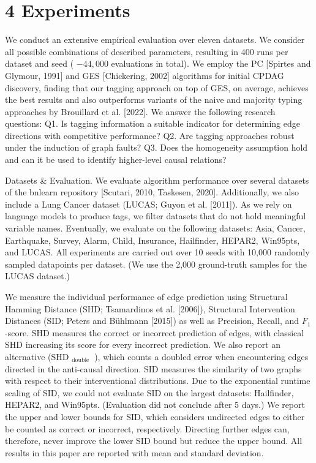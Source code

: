 \documentclass[10pt]{article}
\begin{document}
\section*{4 Experiments}
We conduct an extensive empirical evaluation over eleven datasets. We consider all possible combinations of described parameters, resulting in 400 runs per dataset and seed ( $-44,000$ evaluations in total). We employ the PC [Spirtes and Glymour, 1991] and GES [Chickering, 2002] algorithms for initial CPDAG discovery, finding that our tagging approach on top of GES, on average, achieves the best results and also outperforms variants of the naive and majority typing approaches by Brouillard et al. [2022]. We answer the following research questions: Q1. Is tagging information a suitable indicator for determining edge directions with competitive performance? Q2. Are tagging approaches robust under the induction of graph faults? Q3. Does the homogeneity assumption hold and can it be used to identify higher-level causal relations?

Datasets \& Evaluation. We evaluate algorithm performance over several datasets of the bnlearn repository [Scutari, 2010, Taskesen, 2020]. Additionally, we also include a Lung Cancer dataset (LUCAS; Guyon et al. [2011]). As we rely on language models to produce tags, we filter datasets that do not hold meaningful variable names. Eventually, we evaluate on the following datasets: Asia, Cancer, Earthquake, Survey, Alarm, Child, Insurance, Hailfinder, HEPAR2, Win95pts, and LUCAS. All experiments are carried out over 10 seeds with 10,000 randomly sampled datapoints per dataset. (We use the 2,000 ground-truth samples for the LUCAS dataset.)

We measure the individual performance of edge prediction using Structural Hamming Distance (SHD; Tsamardinos et al. [2006]), Structural Intervention Distances (SID; Peters and Bühlmann [2015]) as well as Precision, Recall, and $F_{1}$-score. SHD measures the correct or incorrect prediction of edges, with classical SHD increasing its score for every incorrect prediction. We also report an alternative (SHD ${ }_{\text {double }}$ ), which counts a doubled error when encountering edges directed in the anti-causal direction. SID measures the similarity of two graphs with respect to their interventional distributions. Due to the exponential runtime scaling of SID, we could not evaluate SID on the largest datasets: Hailfinder, HEPAR2, and Win95pts. (Evaluation did not conclude after 5 days.) We report the upper and lower bounds for SID, which considers undirected edges to either be counted as correct or incorrect, respectively. Directing further edges can, therefore, never improve the lower SID bound but reduce the upper bound. All results in this paper are reported with mean and standard deviation.
\end{document}
